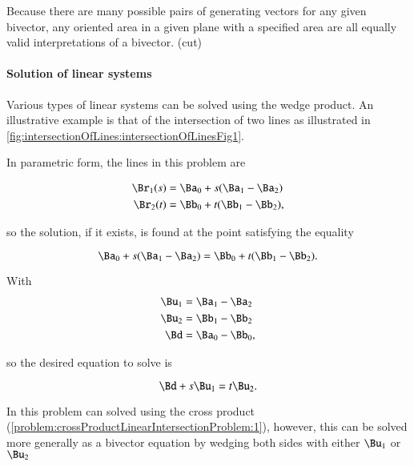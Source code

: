 Because there are many possible pairs of generating vectors for any given bivector, any oriented area in a given plane with a specified area are all equally valid interpretations of a bivector.
(cut)
\paragraph{Solution of linear systems}

Various types of linear systems can be solved using the wedge product.
An illustrative example is that of the intersection of two lines as illustrated in \cref{fig:intersectionOfLines:intersectionOfLinesFig1}.


In parametric form, the lines in this problem are

\begin{dmath}\label{eqn:SimpleProducts2:1000}
\begin{aligned}
\Br_1(s) &= \Ba_0 + s( \Ba_1 - \Ba_2 ) \\
\Br_2(t) &= \Bb_0 + t( \Bb_1 - \Bb_2 ),
\end{aligned}
\end{dmath}

so the solution, if it exists, is found at the point satisfying the equality

\begin{dmath}\label{eqn:SimpleProducts2:1020}
\Ba_0 + s( \Ba_1 - \Ba_2 ) = \Bb_0 + t( \Bb_1 - \Bb_2 ).
\end{dmath}

With
\begin{dmath}\label{eqn:SimpleProducts2:1040}
\begin{aligned}
\Bu_1 &= \Ba_1 - \Ba_2 \\
\Bu_2 &= \Bb_1 - \Bb_2 \\
\Bd &= \Ba_0 - \Bb_0,
\end{aligned}
\end{dmath}

so the desired equation to solve is

\begin{dmath}\label{eqn:SimpleProducts2:1060}
\Bd + s \Bu_1 = t \Bu_2.
\end{dmath}

In  this problem can solved using the cross product (\cref{problem:crossProductLinearIntersectionProblem:1}), however, this can be solved more generally as a
bivector equation by wedging both sides with either \( \Bu_1 \) or \( \Bu_2 \)

